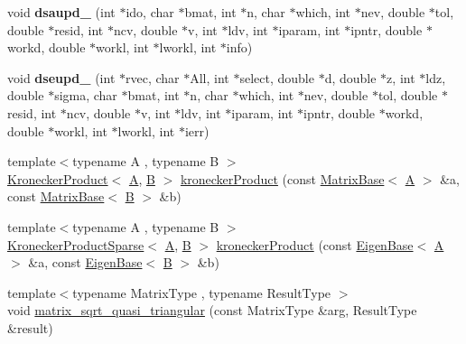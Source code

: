 \begin{DoxyCompactItemize}
\item 
\mbox{\label{namespace_eigen_af4bd56e53bf25dde37e3bc96708cd6c1}} 
void {\bfseries dsaupd\+\_\+} (int $\ast$ido, char $\ast$bmat, int $\ast$n, char $\ast$which, int $\ast$nev, double $\ast$tol, double $\ast$resid, int $\ast$ncv, double $\ast$v, int $\ast$ldv, int $\ast$iparam, int $\ast$ipntr, double $\ast$workd, double $\ast$workl, int $\ast$lworkl, int $\ast$info)
\item 
\mbox{\label{namespace_eigen_a105b4c128a890804f76ed956b9d5bed3}} 
void {\bfseries dseupd\+\_\+} (int $\ast$rvec, char $\ast$All, int $\ast$select, double $\ast$d, double $\ast$z, int $\ast$ldz, double $\ast$sigma, char $\ast$bmat, int $\ast$n, char $\ast$which, int $\ast$nev, double $\ast$tol, double $\ast$resid, int $\ast$ncv, double $\ast$v, int $\ast$ldv, int $\ast$iparam, int $\ast$ipntr, double $\ast$workd, double $\ast$workl, int $\ast$lworkl, int $\ast$ierr)
\item 
{\footnotesize template$<$typename A , typename B $>$ }\\\hyperlink{class_eigen_1_1_kronecker_product}{Kronecker\+Product}$<$ \hyperlink{group___core___module_class_eigen_1_1_matrix}{A}, \hyperlink{group___core___module_class_eigen_1_1_matrix}{B} $>$ \hyperlink{namespace_eigen_aedd4b7cd1e324ed0769cac2701f4d050}{kronecker\+Product} (const \hyperlink{group___core___module_class_eigen_1_1_matrix_base}{Matrix\+Base}$<$ \hyperlink{group___core___module_class_eigen_1_1_matrix}{A} $>$ \&a, const \hyperlink{group___core___module_class_eigen_1_1_matrix_base}{Matrix\+Base}$<$ \hyperlink{group___core___module_class_eigen_1_1_matrix}{B} $>$ \&b)
\item 
{\footnotesize template$<$typename A , typename B $>$ }\\\hyperlink{class_eigen_1_1_kronecker_product_sparse}{Kronecker\+Product\+Sparse}$<$ \hyperlink{group___core___module_class_eigen_1_1_matrix}{A}, \hyperlink{group___core___module_class_eigen_1_1_matrix}{B} $>$ \hyperlink{namespace_eigen_a4e6cd3acfea39bcff3fa38e0de1226f5}{kronecker\+Product} (const \hyperlink{group___core___module_struct_eigen_1_1_eigen_base}{Eigen\+Base}$<$ \hyperlink{group___core___module_class_eigen_1_1_matrix}{A} $>$ \&a, const \hyperlink{group___core___module_struct_eigen_1_1_eigen_base}{Eigen\+Base}$<$ \hyperlink{group___core___module_class_eigen_1_1_matrix}{B} $>$ \&b)
\item 
{\footnotesize template$<$typename Matrix\+Type , typename Result\+Type $>$ }\\void \hyperlink{namespace_eigen_a2f490197e16df831683018e383e29346}{matrix\+\_\+sqrt\+\_\+quasi\+\_\+triangular} (const Matrix\+Type \&arg, Result\+Type \&result)

\end{DoxyCompactItemize}
